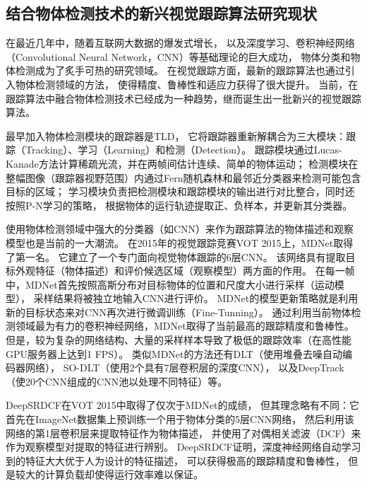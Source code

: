 \subsection{结合物体检测技术的新兴视觉跟踪算法研究现状}
在最近几年中，随着互联网大数据的爆发式增长，
以及深度学习、卷积神经网络（Convolutional Neural Network，CNN）等基础理论的巨大成功，
物体分类和物体检测成为了炙手可热的研究领域。
在视觉跟踪方面，最新的跟踪算法也通过引入物体检测领域的方法，
使得精度、鲁棒性和适应力获得了很大提升。
当前，在跟踪算法中融合物体检测技术已经成为一种趋势，继而诞生出一批新兴的视觉跟踪算法。

最早加入物体检测模块的跟踪器是TLD，
它将跟踪器重新解耦合为三大模块：跟踪（Tracking）、学习（Learning）和检测（Detection）。
跟踪模块通过Lucas-Kanade方法计算稀疏光流，并在两帧间估计连续、简单的物体运动；
检测模块在整幅图像（跟踪器视野范围）内通过Fern随机森林和最邻近分类器来检测可能包含目标的区域；
学习模块负责把检测模块和跟踪模块的输出进行对比整合，同时还按照P-N学习的策略，
根据物体的运行轨迹提取正、负样本，并更新其分类器。

使用物体检测领域中强大的分类器（如CNN）来作为跟踪算法的物体描述和观察模型也是当前的一大潮流。
在2015年的视觉跟踪竞赛VOT 2015上，MDNet取得了第一名。
它建立了一个专门面向视觉物体跟踪的6层CNN。
该网络具有提取目标外观特征（物体描述）和评价候选区域（观察模型）两方面的作用。
在每一帧中，MDNet首先按照高斯分布对目标物体的位置和尺度大小进行采样（运动模型），
采样结果将被独立地输入CNN进行评价。
MDNet的模型更新策略就是利用新的目标状态来对CNN再次进行微调训练（Fine-Tunning）。
通过利用当前物体检测领域最为有力的卷积神经网络，MDNet取得了当前最高的跟踪精度和鲁棒性。
但是，较为复杂的网络结构、大量的采样样本导致了极低的跟踪效率（在高性能GPU服务器上达到1 FPS）。
类似MDNet的方法还有DLT（使用堆叠去噪自动编码器网络），
SO-DLT（使用2个具有7层卷积层的深度CNN），
以及DeepTrack（使20个CNN组成的CNN池以处理不同特征）等。

DeepSRDCF在VOT 2015中取得了仅次于MDNet的成绩，
但其理念略有不同：它首先在ImageNet数据集上预训练一个用于物体分类的5层CNN网络，
然后利用该网络的第1层卷积层来提取特征作为物体描述，
并使用了对偶相关滤波（DCF）来作为观察模型对提取的特征进行辨别。
DeepSRDCF证明，深度神经网络自动学习到的特征大大优于人为设计的特征描述，
可以获得极高的跟踪精度和鲁棒性，
但是较大的计算负载却使得运行效率难以保证。

